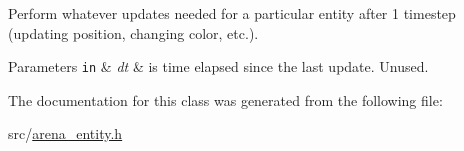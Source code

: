 Perform whatever updates needed for a particular entity after 1 timestep (updating position, changing color, etc.). 


\begin{DoxyParams}[1]{Parameters}
\mbox{\tt in}  & {\em dt} & is time elapsed since the last update. Unused. \\
\hline
\end{DoxyParams}


The documentation for this class was generated from the following file\+:\begin{DoxyCompactItemize}
\item 
src/\mbox{\hyperlink{arena__entity_8h}{arena\+\_\+entity.\+h}}\end{DoxyCompactItemize}
